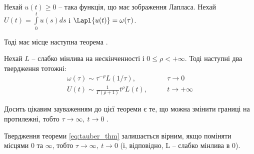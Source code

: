 Нехай $u(t) \geq 0$ – така функція, що має зображення Лапласа. Нехай $U(t)=\int\limits_0^t u(s) ds$ і $\Lapl{u(t)}=\omega(\tau)$.

Тоді має місце наступна теорема \cite[~ст. 445]{Feller}.

\begin{thm}
	\label{eq:tauber_thm}
	Нехай $L$ – слабко мінлива на нескінченності і $0 ≤ \rho < +\infty$. Тоді наступні два твердження тотожні:
	\begin{align}
		\omega(\tau) \sim \tau^{-\rho} L(1/\tau),\qquad &\tau \rightarrow 0 \\
		U(t) \sim \frac{1}{\Gamma(\rho + 1)} t^{\rho} L(t),\qquad &t \rightarrow +\infty
	\end{align}
\end{thm}

Досить цікавим зауваженням до цієї теореми є те, що можна змінити границі на протилежні, тобто $\tau \rightarrow \infty, ~ t \rightarrow 0$ \cite[~ст. 445]{Feller}.

\begin{thm}
	\label{eq:tauber_rev_thm}
	Твердження теореми \eqref{eq:tauber_thm} залишається вірним, якщо поміняти місцями 0 та $\infty$, тобто $\tau \rightarrow \infty, ~ t \rightarrow 0$ (і, відповідно, L – слабко мінлива в 0).
\end{thm}
